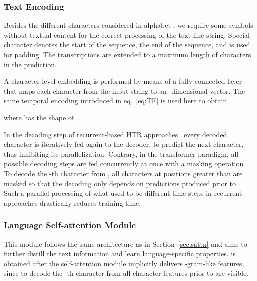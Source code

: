 \documentclass[10pt,twocolumn,letterpaper]{article}
\begin{document}
\subsubsection{Text Encoding}
Besides the different characters considered in alphabet , we require some symbols without textual content for the correct processing of the text-line string. Special character  denotes the start of the sequence,   the end of the sequence, and  is used for padding. The transcriptions  are extended to a maximum length of  characters in the prediction. 

A character-level embedding is performed by means of a fully-connected layer that maps each character from the input string to an -dimensional vector. The same temporal encoding introduced in eq.~\ref{eq:TE} is used here to obtain

where  has the shape of . 

In the decoding step of recurrent-based HTR approaches~\cite{kang2018convolve,michael2019evaluating} every decoded character is iteratively fed again to the decoder, to predict the next character, thus inhibiting its parallelization. Contrary, in the transformer paradigm, all possible decoding steps are fed concurrently at once with a masking operation~\cite{vaswani2017attention}. To decode the -th character from , all characters at positions greater than  are masked so that the decoding only depends on predictions produced prior to . Such a parallel processing of what used to be different time steps in recurrent approaches drastically reduces training time. 







\subsubsection{Language Self-attention Module}
\label{sec:sattn_t}
This module follows the same architecture as in Section~\ref{sec:sattn} and aims to further distill the text information and learn language-specific properties.  is obtained after the self-attention module implicitly delivers -gram-like features, since to decode the -th character from  all character features prior to  are visible.
\end{document}
